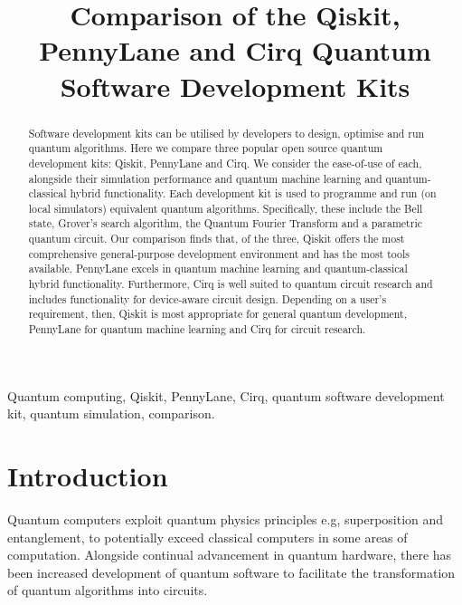 \documentclass[journal]{IEEEtran}
\begin{document}
\title{Comparison of the Qiskit, PennyLane and Cirq Quantum Software Development Kits}

\author{
}

\maketitle

\begin{abstract}
Software development kits can be utilised by developers to design, optimise and run quantum algorithms. Here we compare three popular open source quantum development kits: Qiskit, PennyLane and Cirq. We consider the ease-of-use of each, alongside their simulation performance and quantum machine learning and quantum-classical hybrid functionality. Each development kit is used to programme and run (on local simulators) equivalent quantum algorithms. Specifically, these include the Bell state, Grover's search algorithm, the Quantum Fourier Transform and a parametric quantum circuit. Our comparison finds that, of the three, Qiskit offers the most comprehensive general-purpose development environment and has the most tools available. PennyLane excels in quantum machine learning and quantum-classical hybrid functionality. Furthermore, Cirq is well suited to quantum circuit research and includes functionality for device-aware circuit design. Depending on a user's requirement, then, Qiskit is most appropriate for general quantum development, PennyLane for quantum machine learning and Cirq for circuit research.
\end{abstract}

\begin{IEEEkeywords}
Quantum computing, Qiskit, PennyLane, Cirq, quantum software development kit, quantum simulation, comparison.
\end{IEEEkeywords}

\section{Introduction}
Quantum computers exploit quantum physics principles e.g, superposition and entanglement, to potentially exceed classical computers in some areas of computation. Alongside continual advancement in quantum hardware, there has been increased development of quantum software to facilitate the transformation of quantum algorithms into circuits.
\end{document}
